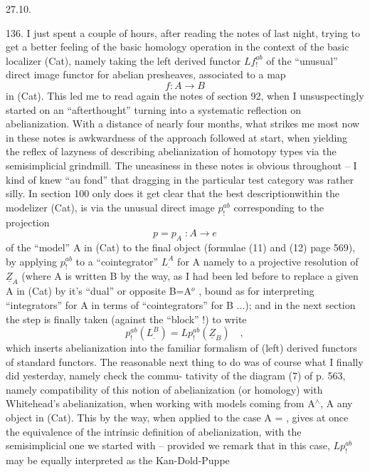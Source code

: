 
27.10.

136.    I just spent a couple of hours,  after reading the notes of last
night,  trying to get a better feeling of the basic homology operation
in the context of the basic localizer (Cat),  namely taking the left
derived functor  $Lf_!^{ab}$ of the ``unusual'' direct image functor for abelian
presheaves,  associated to a map
\[ f: A \longrightarrow B \]
in (Cat).  This led me to read again the notes of section 92,  when I
unsuspectingly started on an ``afterthought''\hand{,} turning into a systematic
reflection on abelianization.  With a distance of nearly four months,
what strikes me most now in these notes is awkwardness of the approach
followed at start,  when yielding the reflex of lazyness of describing
abelianization of homotopy types via the semisimplicial grindmill.  The
uneasiness in these notes is obvious throughout  --  I kind of knew
``au fond'' that dragging in the particular test category \hand{$\Delta$} was rather
silly.  In section 100 only does it get clear that the best\hand{,}
description\hand{,}within the modelizer (Cat), is via the
unusual direct image $p_!^{ab}$ corresponding to the projection
\[ p=p_A \; : A \longrightarrow e \]
of the ``model'' A in (Cat) to the final object (formulae (11) and (12)
page 569),  by applying $p_!^{ab}$ to a ``cointegrator''  $L_{.}^{A}$ for A  namely to a
projective resolution of  $\underline{Z}_A$  (where A is written B by the way,  as 
I had been led before to replace a given A in (Cat) by it's ``dual'' or
opposite B=A$^{o}$ ,  bound as  for interpreting ``integrators'' for A
in terms of ``cointegrators'' for B ...);  and in the next section the
step is finally taken (against the ``block'' !)  to write
\[ p_!^{ab}(L_{.}^{B}) = Lp_!^{ab}(\underline{Z}_B) \quad , \]
which inserts abelianization into the familiar formalism of (left)
derived functors of standard functors.  The reasonable next thing to do
was of course  what I finally did yesterday,  namely check the commu-%
tativity of the diagram (7) of p. 563,  namely compatibility of this
notion of abelianization (or homology) with Whitehead's abelianization,
when working  with models coming from A$^{\wedge}$,  A any object in (Cat).
This by the way,  when applied to the case  A = \hand{$\Delta$} ,  gives at once
the equivalence of the intrinsic definition of abelianization,  with
the semisimplicial one we started with  --  provided we remark that in
this case,  $Lp_!^{ab}$ may be equally interpreted as the Kan-Dold-Puppe
